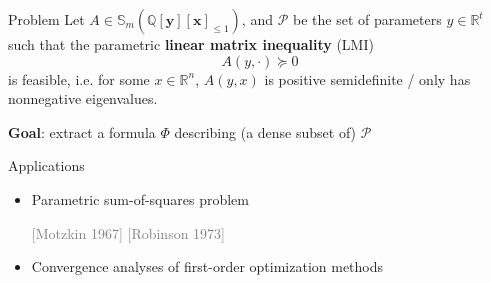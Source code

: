 \documentclass[final]{beamer}
\newlength{\colwidth}
\newcommand{\citeauthorandyear}[2]{\textcolor{gray}{[#1 #2]}}
\begin{document}
\begin{frame}[t]
\begin{columns}[t]
\begin{column}{\colwidth}
            \begin{alertblock}{Problem}
                Let $A\in\mathbb{S}_{m}(\mathbb{Q}[\bm{y}][\bm{x}]_{\leq 1})$,
                and $\mathcal{P}$ be the set of parameters $y\in\mathbb{R}^t$
                such that the parametric \textbf{linear matrix inequality} (LMI)
                \begin{equation*}
                    A(y,\cdot)\succeq 0
                \end{equation*}
                is feasible, i.e. for some $x\in\mathbb{R}^n$,
                $A(y,x)$ is positive semidefinite /
                only has nonnegative eigenvalues.

                \textbf{Goal}: extract a formula $\Phi$ describing
                (a dense subset of) $\mathcal{P}$

                \begin{figure}[H]
                    \centering
                \end{figure}
            \end{alertblock}

            \begin{block}{Applications}
                \begin{itemize}
                    \item Parametric sum-of-squares problem

                          \citeauthorandyear{Motzkin}{1967}
                          \citeauthorandyear{Robinson}{1973}
                    \item Convergence analyses of first-order optimization methods


\end{itemize}
\end{block}
\end{column}
\end{columns}
\end{frame}
\end{document}
